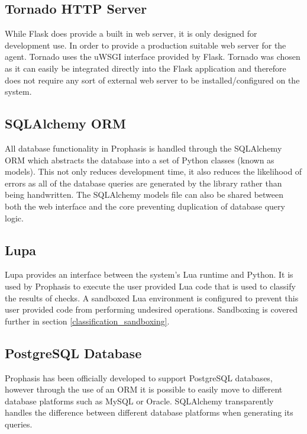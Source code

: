 \documentclass[bsc,logo,twoside,parskip,singlespacing,notimes]{infthesis}
\begin{document}
\subsection{Tornado HTTP Server}

	While Flask does provide a built in web server, it is only designed for
	development	use.  In order to provide a production suitable web server for the
	agent.  Tornado uses the uWSGI interface provided by Flask.  Tornado was chosen
	as it can easily be integrated directly into the Flask application and
	therefore does not require any sort of external web server to be
	installed/configured on the system.

\subsection{SQLAlchemy ORM}

	All database functionality in Prophasis is handled through the SQLAlchemy ORM
	which abstracts the database into a set of Python classes (known as models).
	This not only reduces development time, it also reduces the likelihood of
	errors as all of the database queries are generated by the library rather than
	being handwritten.  The SQLAlchemy models file can also be shared between both
	the web interface and the core preventing duplication of database query logic.

\subsection{Lupa}

	Lupa provides an interface between the system's Lua runtime and Python.  It is
	used by Prophasis to execute the user provided Lua code that is used to
	classify the results of checks. A sandboxed Lua environment is configured to
	prevent this user provided code from performing undesired operations.
	Sandboxing is covered further in section \ref{classification_sandboxing}.

\subsection{PostgreSQL Database}

	Prophasis has been officially developed to support PostgreSQL databases,
	however through the use of an ORM it is possible to easily move to different
	database platforms such as MySQL or Oracle.  SQLAlchemy transparently handles
	the difference between different database platforms when generating its
	queries.
\end{document}
